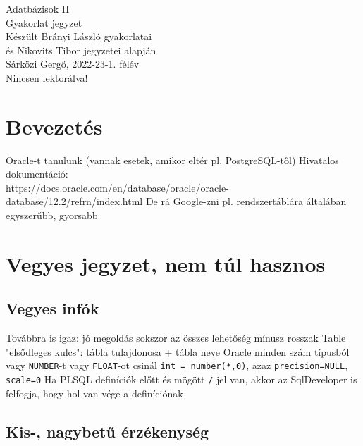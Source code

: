 \documentclass[12pt,a4paper]{article}
\begin{document}
\begin{center}
	\huge
	Adatbázisok II\\
	\vspace{1mm}
	\LARGE
	Gyakorlat jegyzet\\
	\vspace{5mm}
	\large
	Készült Brányi László gyakorlatai\\
	és Nikovits Tibor jegyzetei alapján\\
	\vspace{5mm}
	Sárközi Gergő, 2022-23-1. félév\\
	Nincsen lektorálva!
\end{center}

\tableofcontents

\pagebreak

\section{Bevezetés}

\begin{outline}
	\1 Oracle-t tanulunk (vannak esetek, amikor eltér pl. PostgreSQL-től)
	\1 Hivatalos dokumentáció:\\
	https://docs.oracle.com/en/database/oracle/oracle-database/12.2/refrn/index.html
		\2 De rá Google-zni pl. rendszertáblára általában egyszerűbb, gyorsabb
\end{outline}

\section{Vegyes jegyzet, nem túl hasznos}

\subsection{Vegyes infók}

\begin{outline}
	\1 Továbbra is igaz: jó megoldás sokszor az összes lehetőség mínusz rosszak
	\1 Table "elsődleges kulcs": tábla tulajdonosa + tábla neve
	\1 Oracle minden szám típusból vagy \texttt{NUMBER}-t vagy \texttt{FLOAT}-ot csinál
		\2 \texttt{int = number(*,0)}, azaz \texttt{precision=NULL}, \texttt{scale=0}
	\1 Ha PLSQL definíciók előtt és mögött \texttt{/} jel van, akkor az SqlDeveloper is felfogja, hogy hol van vége a definíciónak
\end{outline}

\subsection{Kis-, nagybetű érzékenység}
\end{document}
